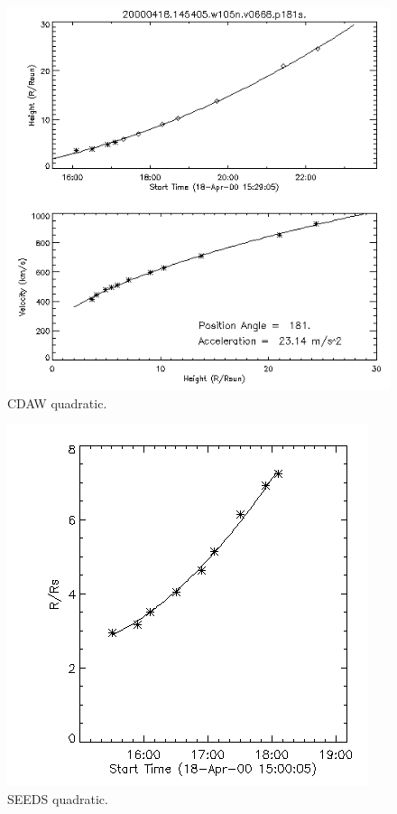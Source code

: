 \documentclass[preprint2]{aastex}
\begin{document}
\begin{figure}[]
\centerline{\includegraphics[width=\linewidth]{images/20000418_cdaw_kins.png}}
\caption{CDAW quadratic.}
\label{}
\end{figure}

\begin{figure}[]
\centerline{\includegraphics[width=\linewidth]{images/20000418_153005_seeds_acc.png}}
\caption{SEEDS quadratic.}
\label{}
\end{figure}
\end{document}
